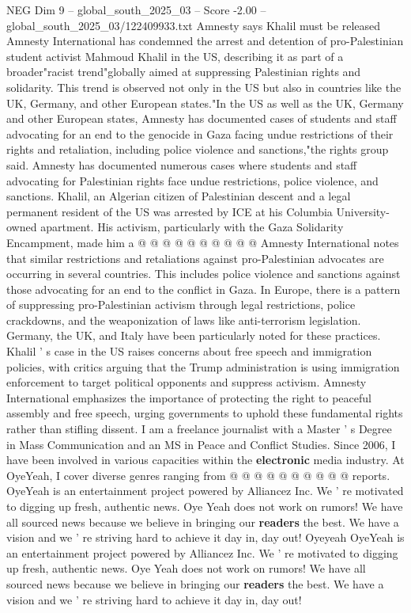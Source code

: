 \begin{textsample}{NEG Dim 9 – global\_south\_2025\_03 – Score -2.00 – global\_south\_2025\_03/122409933.txt}  \label{ex:f9_neg_322}
Amnesty says Khalil must be released Amnesty International has condemned the arrest and detention of pro-Palestinian student activist Mahmoud Khalil in the US, describing it as part of a broader"racist trend"globally aimed at suppressing Palestinian rights and solidarity.
This trend is observed not only in the US but also in countries like the UK, Germany, and other European states."In the US as well as the UK, Germany and other European states, Amnesty has documented cases of students and staff advocating for an end to the genocide in Gaza facing undue restrictions of their rights and retaliation, including police violence and sanctions,"the rights group said.
Amnesty has documented numerous cases where students and staff advocating for Palestinian rights face undue restrictions, police violence, and sanctions.
Khalil, an Algerian citizen of Palestinian descent and a legal permanent resident of the US was arrested by ICE at his Columbia University-owned apartment.
His activism, particularly with the Gaza Solidarity Encampment, made him a @ @ @ @ @ @ @ @ @ @ Amnesty International notes that similar restrictions and retaliations against pro-Palestinian advocates are occurring in several countries.
This includes police violence and sanctions against those advocating for an end to the conflict in Gaza.
In Europe, there is a pattern of suppressing pro-Palestinian activism through legal restrictions, police crackdowns, and the weaponization of laws like anti-terrorism legislation.
Germany, the UK, and Italy have been particularly noted for these practices.
Khalil ' s case in the US raises concerns about free speech and immigration policies, with critics arguing that the Trump administration is using immigration enforcement to target political opponents and suppress activism.
Amnesty International emphasizes the importance of protecting the right to peaceful assembly and free speech, urging governments to uphold these fundamental rights rather than stifling dissent.
I am a freelance journalist with a Master ' s Degree in Mass Communication and an MS in Peace and Conflict Studies.
Since 2006, I have been involved in various capacities within the \textbf{electronic} media industry.
At OyeYeah, I cover diverse genres ranging from @ @ @ @ @ @ @ @ @ @ reports.
OyeYeah is an entertainment project powered by Alliancez Inc.
We ' re motivated to digging up fresh, authentic news.
Oye Yeah does not work on rumors!
We have all sourced news because we believe in bringing our \textbf{readers} the best.
We have a vision and we ' re striving hard to achieve it day in, day out!
Oyeyeah OyeYeah is an entertainment project powered by Alliancez Inc.
We ' re motivated to digging up fresh, authentic news.
Oye Yeah does not work on rumors!
We have all sourced news because we believe in bringing our \textbf{readers} the best.
We have a vision and we ' re striving hard to achieve it day in, day out!

\end{textsample}
